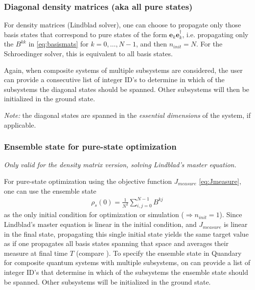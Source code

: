 \documentclass[11pt]{article}
\begin{document}
\subsubsection{Diagonal density matrices (aka all pure states)}

For density matrices (Lindblad solver), one can choose to propagate only those basis states that correspond to pure states of the form $\boldsymbol{e}_k\boldsymbol{e}_k^\dagger$, i.e. propagating only the $B^{kk}$ in \eqref{eq:basismats} for $k=0,\dots, N-1$, and then $n_{init}=N$. For the Schroedinger solver, this is equivalent to all basis states. 

Again, when composite systems of multiple subsystems are considered, the user can provide a consecutive list of integer ID's to determine in which of the subsystems the diagonal states should be spanned. Other subsystems will then be initialized in the ground state.

\textit{Note:} the diagonal states are spanned in the \textit{essential dimensions} of the system, if applicable. 



\subsubsection{Ensemble state for pure-state optimization}\label{sec:ensemblestate}
\textit{Only valid for the density matrix version, solving Lindblad's master equation.}

For pure-state optimization using the objective function $J_{measure}$ \eqref{eq:Jmeasure}, one can use the ensemble state 
\begin{align}\label{eq:ensemblestate}
  \rho_s(0) = \frac{1}{N^2}\sum_{i,j=0}^{N-1} B^{kj}
\end{align}
as the only initial condition for optimization or simulation ($\Rightarrow n_{init}=1$). Since Lindblad's master equation is linear in the initial condition, and $J_{measure}$ is linear in the final state, propagating this single initial state yields the same target value as if one propagates all basis states spanning that space and averages their measure at final time $T$ (compare \cite{guenther2021quantum}). To specify the ensemble state in Quandary for composite quantum systems with multiple subsystems, on can provide a list of integer ID's that determine in which of the subsystems the ensemble state should be spanned. Other subsystems will be initialized in the ground state. 
\end{document}
